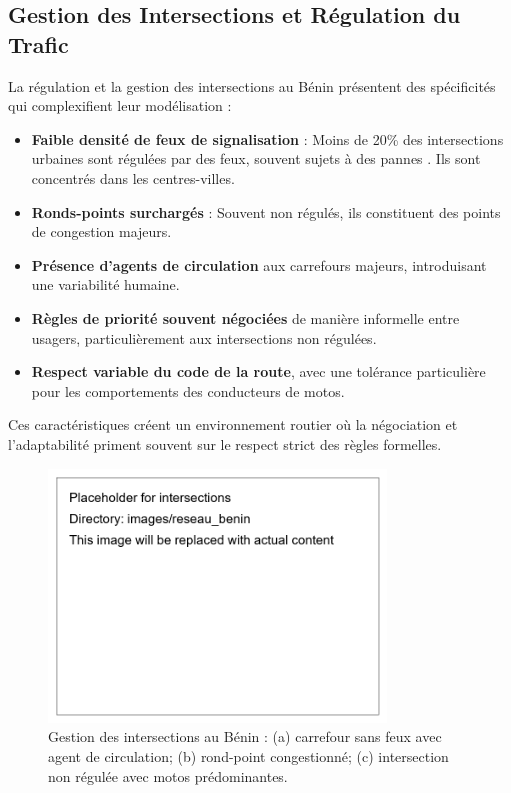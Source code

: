 \subsection{Gestion des Intersections et Régulation du Trafic}
\label{subsec:gestion_intersections_regulation}

La régulation et la gestion des intersections au Bénin présentent des spécificités qui complexifient leur modélisation :
\begin{itemize}
    \item \textbf{Faible densité de feux de signalisation} : Moins de 20\% des intersections urbaines sont régulées par des feux, souvent sujets à des pannes \cite{loggoh2019traffic}. Ils sont concentrés dans les centres-villes.
    \item \textbf{Ronds-points surchargés} : Souvent non régulés, ils constituent des points de congestion majeurs.
    \item \textbf{Présence d'agents de circulation} aux carrefours majeurs, introduisant une variabilité humaine.
    \item \textbf{Règles de priorité souvent négociées} de manière informelle entre usagers, particulièrement aux intersections non régulées.
    \item \textbf{Respect variable du code de la route}, avec une tolérance particulière pour les comportements des conducteurs de motos.
\end{itemize}
Ces caractéristiques créent un environnement routier où la négociation et l'adaptabilité priment souvent sur le respect strict des règles formelles.

\begin{figure}[htbp]
    \centering
    \includegraphics[width=0.8\textwidth]{images/reseau_benin/intersections} %
    \caption{Gestion des intersections au Bénin : (a) carrefour sans feux avec agent de circulation; (b) rond-point congestionné; (c) intersection non régulée avec motos prédominantes.}
    \label{fig:intersections} %
\end{figure}

